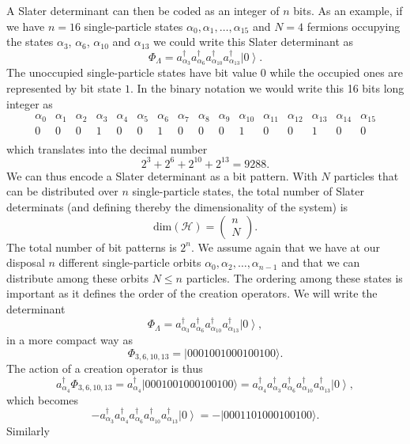 \documentclass[prc]{revtex4}
\newcommand{\ket}[1]{\left| #1 \right\rangle}
\begin{document}
A Slater  determinant can then be coded as an integer of $n$ bits. As an example, if we have $n=16$ single-particle states
$\alpha_0,\alpha_1,\dots,\alpha_{15}$ and $N=4$ fermions occupying the states $\alpha_3$, $\alpha_6$, $\alpha_{10}$ and $\alpha_{13}$
we could write this Slater determinant as  
\[
\Phi_{\Lambda} = a_{\alpha_3}^\dagger a_{\alpha_6}^\dagger a_{\alpha_{10}}^\dagger a_{\alpha_{13}}^\dagger \ket{0}.
\]
The unoccupied single-particle states have bit value $0$ while the occupied ones are represented by bit state $1$. 
In the binary notation we would write this   16 bits long integer as
\[
\begin{array}{cccccccccccccccc}
{\alpha_0}&{\alpha_1}&{\alpha_2}&{\alpha_3}&{\alpha_4}&{\alpha_5}&{\alpha_6}&{\alpha_7} & {\alpha_8} &{\alpha_9} & {\alpha_{10}} &{\alpha_{11}} &{\alpha_{12}} &{\alpha_{13}} &{\alpha_{14}} & {\alpha_{15}} \\
{0} & {0} &{0} &{1} &{0} &{0} &{1} &{0} &{0} &{0} &{1} &{0} &{0} &{1} &{0} & {0} \\
\end{array}
\]
which translates into the decimal number
\[
2^3+2^6+2^{10}+2^{13}=9288.
\]
We can thus encode a Slater determinant as a bit pattern.
With $N$ particles that can be distributed over $n$ single-particle states, the total number of Slater determinats (and defining thereby the dimensionality of the system) is
\[
\mathrm{dim}(\mathcal{H}) = \left(\begin{array}{c} n \\N\end{array}\right).
\]
The total number of bit patterns is $2^n$. 
We assume again that we have at our disposal $n$ different single-particle orbits
$\alpha_0,\alpha_2,\dots,\alpha_{n-1}$ and that we can distribute  among these orbits $N\le n$ particles.
The ordering among these states is important as it defines the order of the creation operators.
We will write the determinant 
\[
\Phi_{\Lambda} = a_{\alpha_3}^\dagger a_{\alpha_6}^\dagger a_{\alpha_{10}}^\dagger a_{\alpha_{13}}^\dagger \ket{0},
\]
in a more compact way as 
\[
\Phi_{3,6,10,13} = |0001001000100100\rangle.
\]
The action of a creation operator is thus
\[
a^\dagger_{\alpha_4}\Phi_{3,6,10,13} = a^\dagger_{\alpha_4}|0001001000100100\rangle=a^\dagger_{\alpha_4}a_{\alpha_3}^\dagger a_{\alpha_6}^\dagger a_{\alpha_{10}}^\dagger a_{\alpha_{13}}^\dagger \ket{0},
\]
which becomes
\[
-a_{\alpha_3}^\dagger a^\dagger_{\alpha_4} a_{\alpha_6}^\dagger a_{\alpha_{10}}^\dagger a_{\alpha_{13}}^\dagger \ket{0}=-|0001101000100100\rangle.
\]
Similarly
\end{document}
